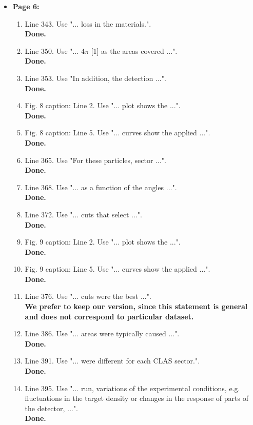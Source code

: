 \documentclass[,superscriptaddress,showpacs,amssymb,amsmath,amsfonts,linenumbers,article]{revtex4-1}
\begin{document}
\begin{itemize}
\begin{enumerate}
\end{enumerate}


\item {\bf \large  Page 6:}

\begin{enumerate} 

\item Line 343. Use "... loss in the materials.".\\
{\bf Done.}
\item Line 350. Use "... 4$\pi$ [1] as the areas covered ...".\\
{\bf Done.}
\item Line 353. Use "In addition, the detection ...".\\
{\bf Done.}
\item Fig. 8 caption: Line 2. Use "... plot shows the ...".\\
{\bf Done.}
\item Fig. 8 caption: Line 5. Use "... curves show the applied ...".\\
{\bf Done.}
\item Line 365. Use "For these particles, sector ...".\\
{\bf Done.}
\item Line 368. Use "... as a function of the angles ...".\\
{\bf Done.}
\item Line 372. Use "... cuts that select ...".\\
{\bf Done.}
\item Fig. 9 caption: Line 2. Use "... plot shows the ...".\\
{\bf Done.}
\item Fig. 9 caption: Line 5. Use "... curves show the applied ...".\\
{\bf Done.}
\item Line 376. Use "... cuts were the best ...".\\
{\bf We prefer to keep our version, since this statement is general and does not correspond to particular dataset.}
\item Line 386. Use "... areas were typically caused ...".\\
{\bf Done.}
\item Line 391. Use "... were different for each CLAS sector.".\\
{\bf Done.}
\item Line 395. Use "... run, variations of the experimental conditions, e.g. fluctuations in the target density or changes in the response of parts of the detector, ...".\\
{\bf Done.}
\end{enumerate} 



\end{itemize}
\end{document}
